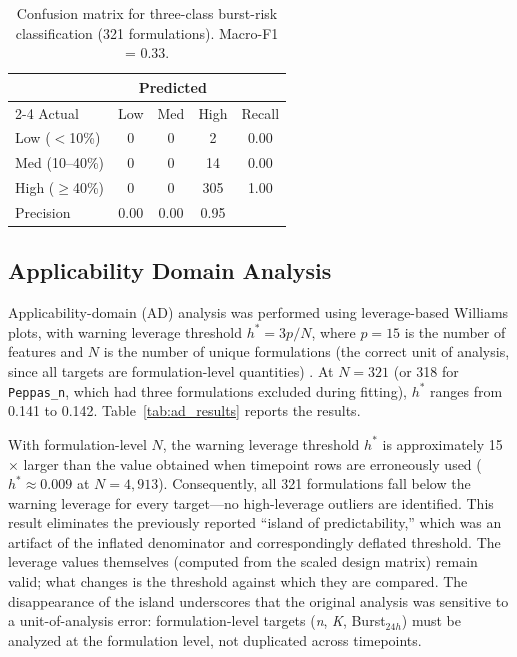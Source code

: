 \begin{table}[H]
\centering
\caption{Confusion matrix for three-class burst-risk classification (321 formulations). Macro-F1 = 0.33.}
\label{tab:confusion_matrix}
\begin{tabular}{lccc|c}
\toprule
 & \multicolumn{3}{c}{Predicted} & \\
\cmidrule(lr){2-4}
Actual & Low & Med & High & Recall \\
\midrule
Low ($<$10\%) & 0 & 0 & 2 & 0.00 \\
Med (10--40\%) & 0 & 0 & 14 & 0.00 \\
High ($\geq$40\%) & 0 & 0 & 305 & 1.00 \\
\midrule
Precision & 0.00 & 0.00 & 0.95 & \\
\bottomrule
\end{tabular}
\end{table}

\FloatBarrier

\subsection{Applicability Domain Analysis}

Applicability-domain (AD) analysis was performed using leverage-based Williams plots, with warning leverage threshold $h^* = 3p/N$, where $p = 15$ is the number of features and $N$ is the number of unique formulations (the correct unit of analysis, since all targets are formulation-level quantities) \citep{Eriksson2003}. At $N = 321$ (or 318 for \texttt{Peppas\_n}, which had three formulations excluded during fitting), $h^*$ ranges from 0.141 to 0.142. Table~\ref{tab:ad_results} reports the results.

With formulation-level $N$, the warning leverage threshold $h^*$ is approximately 15$\times$ larger than the value obtained when timepoint rows are erroneously used ($h^* \approx 0.009$ at $N = 4{,}913$). Consequently, all 321 formulations fall below the warning leverage for every target---no high-leverage outliers are identified. This result eliminates the previously reported ``island of predictability,'' which was an artifact of the inflated denominator and correspondingly deflated threshold. The leverage values themselves (computed from the scaled design matrix) remain valid; what changes is the threshold against which they are compared. The disappearance of the island underscores that the original analysis was sensitive to a unit-of-analysis error: formulation-level targets (\textit{n}, \textit{K}, Burst$_{24h}$) must be analyzed at the formulation level, not duplicated across timepoints.

